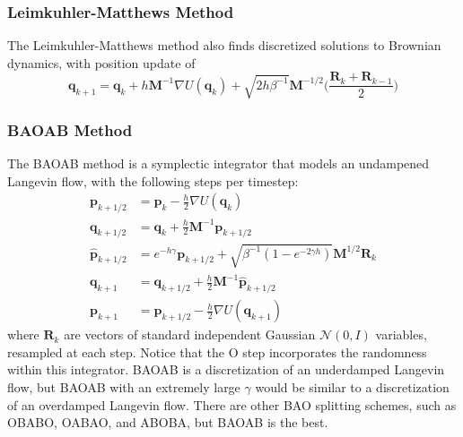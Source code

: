 \documentclass{article}
\theoremstyle{remark}
\theoremstyle{definition}
\begin{document}
\subsubsection{Leimkuhler-Matthews Method}
The Leimkuhler-Matthews method also finds discretized solutions to Brownian dynamics, with position update of 
\[\mathbf{q}_{k+1} = \mathbf{q}_k + h \mathbf{M}^{-1} \nabla U(\mathbf{q}_k) + \sqrt{2 h \beta^{-1}} \mathbf{M}^{-1/2} \bigg( \frac{\mathbf{R}_k + \mathbf{R}_{k-1}}{2} \bigg)\]

\subsubsection{BAOAB Method}

The BAOAB method is a symplectic integrator that models an undampened Langevin flow, with the following steps per timestep: 
\begin{align*}
    \mathbf{p}_{k + 1/2} & = \mathbf{p}_k - \frac{h}{2} \nabla U(\mathbf{q}_k) \\
    \mathbf{q}_{k + 1/2} & = \mathbf{q}_k + \frac{h}{2} \mathbf{M}^{-1} \mathbf{p}_{k + 1/2} \\
    \mathbf{\hat{p}}_{k + 1/2} & = e^{-h \gamma} \mathbf{p}_{k + 1/2} + \sqrt{\beta^{-1} (1 - e^{-2\gamma h})} \mathbf{M}^{1/2} \mathbf{R}_k \\ 
    \mathbf{q}_{k + 1} & = \mathbf{q}_{k + 1/2} + \frac{h}{2} \mathbf{M}^{-1} \mathbf{\hat{p}}_{k + 1/2} \\
    \mathbf{p}_{k + 1} & = \mathbf{\hat{p}}_{k + 1/2} - \frac{h}{2} \nabla U(\mathbf{q}_{k + 1}) 
\end{align*}
where $\mathbf{R}_k$ are vectors of standard independent Gaussian $\mathcal{N}(0, I)$ variables, resampled at each step. Notice that the O step incorporates the randomness within this integrator. 
BAOAB is a discretization of an underdamped Langevin flow, but BAOAB with an extremely large $\gamma$ would be similar to a discretization of an overdamped Langevin flow. There are other BAO splitting schemes, such as OBABO, OABAO, and ABOBA, but BAOAB is the best. 
\end{document}
